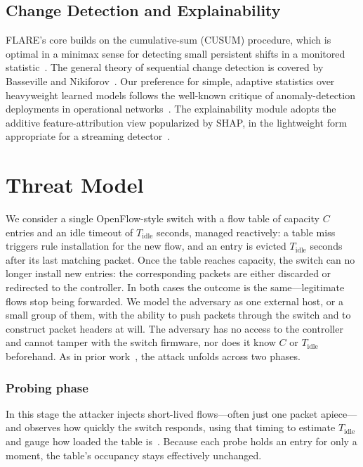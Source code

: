 \documentclass[conference]{IEEEtran}
\begin{document}
\subsection{Change Detection and Explainability}
FLARE's core builds on the cumulative-sum (CUSUM) procedure, which is optimal in
a minimax sense for detecting small persistent shifts in a monitored
statistic~\cite{page1954cusum}. The general theory of sequential change
detection is covered by Basseville and
Nikiforov~\cite{basseville1993detection}. Our preference for simple, adaptive
statistics over heavyweight learned models follows the well-known critique of
anomaly-detection deployments in operational networks~\cite{sommer2010outside}.
The explainability module adopts the additive feature-attribution view
popularized by SHAP, in the lightweight form appropriate for a streaming
detector~\cite{lundberg2017shap}.

\section{Threat Model}\label{sec:threat}
We consider a single OpenFlow-style switch with a flow table of capacity $C$
entries and an idle timeout of $T_{\mathrm{idle}}$ seconds, managed reactively:
a table miss triggers rule installation for the new flow, and an entry is
evicted $T_{\mathrm{idle}}$ seconds after its last matching packet. Once the table reaches capacity, the switch can no longer install new entries: the corresponding packets are either discarded or redirected to the controller. In both cases the outcome is the same—legitimate flows stop being forwarded. We model the adversary as one external host, or a small group of them, with the ability to push packets through the switch and to construct packet headers at will. The adversary has no access to the controller and cannot tamper with the
switch firmware, nor does it know $C$ or $T_{\mathrm{idle}}$ beforehand. As in
prior work~\cite{cao2017loft}, the attack unfolds across two phases.

\subsubsection{Probing phase} In this stage the attacker injects short-lived
flows---often just one packet apiece---and observes how quickly the switch
responds, using that timing to estimate $T_{\mathrm{idle}}$ and gauge how
loaded the table is~\cite{leng2015inference}. Because each probe holds an
entry for only a moment, the table's occupancy stays effectively unchanged.
\end{document}
